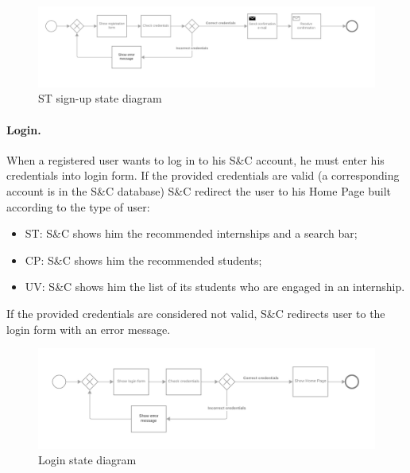 \begin{figure}[H]
    \begin{center}
        \includegraphics[width=1\linewidth]{RASD/LaTeX/Images/StateDiagrams/signup.png}
        \caption{ST sign-up state diagram}
        \label{fig:signup_sd}%
    \end{center}
\end{figure}

\paragraph{Login.}
When a registered user wants to log in to his S\&C account, he must enter his credentials into login form.
If the provided credentials are valid (a corresponding account is in the S\&C database) S\&C redirect the user to his Home Page built according to the type of user:
\begin{itemize}
    \item ST: S\&C shows him the recommended internships and a search bar;
    \item CP: S\&C shows him the recommended students;
    \item UV: S\&C shows him the list of its students who are engaged in an internship.
\end{itemize}
If the provided credentials are considered not valid, S\&C redirects user to the login form with an error message.

\begin{figure}[H]
    \begin{center}
        \includegraphics[width=1\linewidth]{RASD/LaTeX/Images/StateDiagrams/login.png}
        \caption{Login state diagram}
        \label{fig:login_sd}%
    \end{center}
\end{figure}

